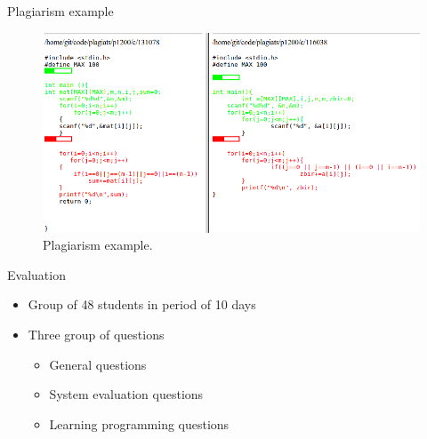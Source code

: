 \begin{frame}{Plagiarism example}
    \begin{figure}
    \centering
        \includegraphics[width=.9\textwidth]{../code_usage/plagiat_example}
        \caption{Plagiarism example.}
        \label{fig:plagiat_example}
    \end{figure}
\end{frame}

\begin{frame}{Evaluation}
    \begin{itemize}
      \item Group of 48 students in period of 10 days
      \item Three group of questions
      \begin{itemize}
      \item General questions
      \item System evaluation questions
      \item Learning programming questions
      \end{itemize}
    \end{itemize}
\end{frame}

